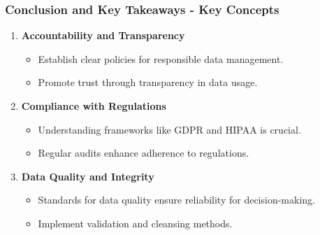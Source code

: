 \documentclass{beamer}
\begin{document}
\begin{frame}[fragile]
    \frametitle{Conclusion and Key Takeaways - Key Concepts}
    
    \begin{enumerate}
        \item \textbf{Accountability and Transparency} 
            \begin{itemize}
                \item Establish clear policies for responsible data management.
                \item Promote trust through transparency in data usage.
            \end{itemize}
        
        \item \textbf{Compliance with Regulations}
            \begin{itemize}
                \item Understanding frameworks like GDPR and HIPAA is crucial.
                \item Regular audits enhance adherence to regulations.
            \end{itemize}
        
        \item \textbf{Data Quality and Integrity}
            \begin{itemize}
                \item Standards for data quality ensure reliability for decision-making.
                \item Implement validation and cleansing methods.
            \end{itemize}
    \end{enumerate}
\end{frame}
\end{document}
